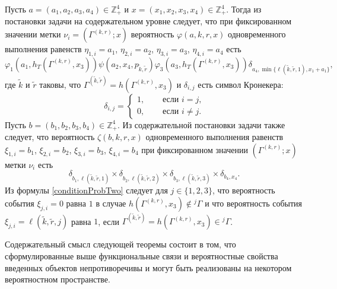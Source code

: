 \documentclass[a4paper,twoside]{article}
\theoremstyle{theorem}
\theoremstyle{remark}
\renewcommand{\Pr}{{\mathbf P}}
\begin{document}
Пусть $a=(a_1, a_2, a_3, a_4) \in \mathbb{Z}_+^4$ и $x=(x_1, x_2, x_3, x_4) \in \mathbb{Z}_+^4$. Тогда из постановки задачи на содержательном уровне следует, что при фиксированном значении метки $\nu_i=(\Gamma^{(k,r)}; x)$ вероятность $\varphi(a,k,r,x)$ одновременного выполнения равенств $\eta_{1,i}=a_1$, $\eta_{2,i}=a_2$, $\eta_{3,i}=a_3$, $\eta_{4,i}=a_4$ есть 
\begin{equation}
\varphi_1(a_1,h_T(\Gamma^{(k,r)},x_3)) \psi(a_2,x_4, p_{\tilde{k},\tilde{r}})  \varphi_3(a_3,h_T(\Gamma^{(k,r)},x_3))
 \delta_{a_4,\min{\{\ell(\tilde{k},\tilde{r},1), x_1+a_1}\}},
\label{conditionProbOne}
\end{equation}
где $\tilde{k}$ и $\tilde{r}$ таковы, что $\Gamma^{(\tilde{k},\tilde{r})}=h(\Gamma^{(k,r)},x_3)$ и $\delta_{i,j}$ есть символ Кронекера:
$$
\delta_{i,j}=
\begin{cases} 
1,& \quad \text{ если $i=j$,}\\
0,& \quad \text{ если $i\neq j$.}
\end{cases}
$$%
Пусть $b=(b_1, b_2, b_3, b_4) \in \mathbb{Z}_+^4$. Из содержательной постановки задачи также следует, что вероятность $\zeta(b, k, r, x)$ одновременного выполнения равенств $\xi_{1,i}=b_1$, $\xi_{2,i}=b_2$, $\xi_{3,i}=b_3$, $\xi_{4,i}=b_4$ при фиксированном значении $(\Gamma^{(k,r)}; x)$ метки $\nu_i$ есть
\begin{equation}
\delta_{b_1,\ell(\tilde{k},\tilde{r},1)} \times \delta_{b_2,\ell(\tilde{k},\tilde{r},2)} \times 
\delta_{b_3,\ell(\tilde{k},\tilde{r},3)} \times \delta_{b_4,x_4}.
\label{conditionProbTwo}
\end{equation}
Из формулы \eqref{conditionProbTwo} следует для $j\in \{1, 2, 3\}$, что вероятность события $\xi_{j,i}=0$ равна $1$ в случае $h(\Gamma^{(k,r)},x_3)\notin {}^j\Gamma$ и что вероятность события $\xi_{j,i}=\ell(\tilde{k},\tilde{r},j)$ равна $1$, если $\Gamma^{(\tilde{k},\tilde{r})}=h(\Gamma^{(k,r)},x_3)\in {}^j\Gamma$.


Содержательный смысл следующей теоремы состоит в том, что сформулированные выше функциональные связи и вероятностные свойства введенных объектов непротиворечивы и могут быть реализованы на некотором вероятностном пространстве.
\end{document}
